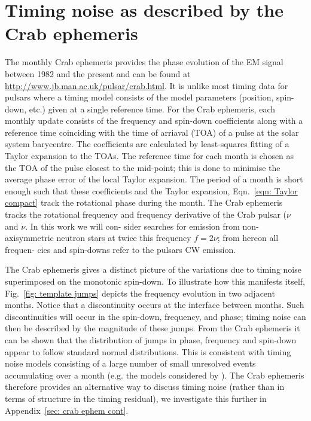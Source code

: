 \documentclass[../full_thesis/full_thesis.tex]{subfiles}
\begin{document}
\section{Timing noise as described by the Crab ephemeris}
\label{sec: timing noise as described by the crab ephemeris}
The monthly Crab ephemeris \citep{Lyne1993} provides the phase evolution of the
EM signal between 1982 and the present and can be found at
\url{http://www.jb.man.ac.uk/pulsar/crab.html}. It is unlike most timing data
for pulsars where a timing model consists of the model parameters (position,
spin-down, etc.) given at a single reference time.  For the Crab ephemeris,
each monthly update consists of the frequency and spin-down coefficients along
with a reference time coinciding with the time of arriaval (TOA) of a pulse at
the solar system barycentre. The coefficients are calculated by  least-squares
fitting of a Taylor expansion to the TOAs. The reference time for each month is
chosen as the TOA of the pulse closest to the mid-point; this is done to
minimise the average phase error of the local Taylor expansion.  The period of
a month is short enough such that these coefficients and the Taylor
expansion, Eqn.~\eqref{eqn: Taylor compact} track the rotational phase during
the month. The Crab ephemeris tracks
the rotational frequency and frequency derivative of the Crab pulsar ($\nu$ and
$\dot{\nu}$. In this work we will con- sider searches for emission from
non-axisymmetric neutron stars at twice this frequency $f = 2\nu$; from hereon
all frequen- cies and spin-downs refer to the pulsars CW emission.

The Crab ephemeris gives a distinct picture of the variations due to timing
noise superimposed on the monotonic spin-down. To illustrate how this manifests
itself, Fig.~\ref{fig: template jumps} depicts the frequency evolution in two
adjacent months. Notice that a discontinuity occurs at the interface between
months.  Such discontinuities will occur in the spin-down, frequency, and
phase; timing noise can then be described by the magnitude of these jumps.
From the Crab ephemeris it can be shown that the distribution of jumps in
phase, frequency and spin-down appear to follow standard normal distributions.
This is consistent with timing noise models consisting of a large number of
small unresolved events accumulating over a month (e.g. the models considered
by \citet{Cordes1981}). The Crab ephemeris therefore provides an alternative
way to discuss timing noise (rather than in terms of structure in the timing
residual), we investigate this further in Appendix~\ref{sec: crab ephem cont}.
\end{document}
